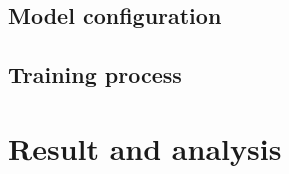 \documentclass[11pt]{article}
\begin{document}
\subsection{Model configuration}\label{sec:model-config}

\subsection{Training process}\label{sec:training-process}

\section{Result and analysis}\label{sec:results-analysis}

\nocite{*}





\end{document}
